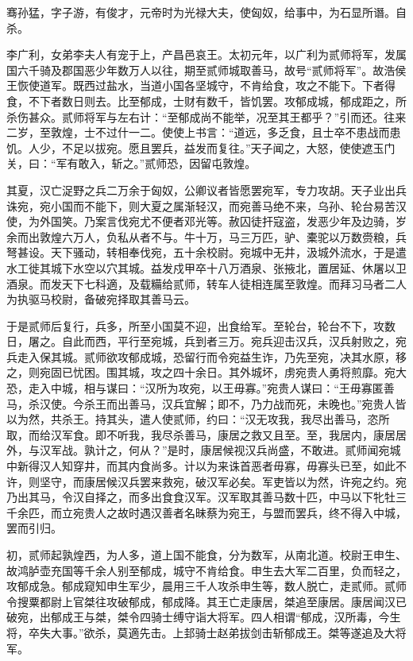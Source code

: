 \documentclass[]{article}
\begin{document}
骞孙猛，字子游，有俊才，元帝时为光禄大夫，使匈奴，给事中，为石显所谮。自杀。

李广利，女弟李夫人有宠于上，产昌邑哀王。太初元年，以广利为贰师将军，发属国六千骑及郡国恶少年数万人以往，期至贰师城取善马，故号``贰师将军''。故浩侯王恢使道军。既西过盐水，当道小国各坚城守，不肯给食，攻之不能下。下者得食，不下者数日则去。比至郁成，士财有数千，皆饥罢。攻郁成城，郁成距之，所杀伤甚众。贰师将军与左右计：``至郁成尚不能举，况至其王都乎？''引而还。往来二岁，至敦煌，士不过什一二。使使上书言：``道远，多乏食，且士卒不患战而患饥。人少，不足以拔宛。愿且罢兵，益发而复往。''天子闻之，大怒，使使遮玉门关，曰：``军有敢入，斩之。''贰师恐，因留屯敦煌。

其夏，汉亡浞野之兵二万余于匈奴，公卿议者皆愿罢宛军，专力攻胡。天子业出兵诛宛，宛小国而不能下，则大夏之属渐轻汉，而宛善马绝不来，乌孙、轮台易苦汉使，为外国笑。乃案言伐宛尤不便者邓光等。赦囚徒扞寇盗，发恶少年及边骑，岁余而出敦煌六万人，负私从者不与。牛十万，马三万匹，驴、橐驼以万数赍粮，兵弩甚设。天下骚动，转相奉伐宛，五十余校尉。宛城中无井，汲城外流水，于是遣水工徙其城下水空以穴其城。益发戍甲卒十八万酒泉、张掖北，置居延、休屠以卫酒泉。而发天下七科適，及载糒给贰师，转车人徒相连属至敦煌。而拜习马者二人为执驱马校尉，备破宛择取其善马云。

于是贰师后复行，兵多，所至小国莫不迎，出食给军。至轮台，轮台不下，攻数日，屠之。自此而西，平行至宛城，兵到者三万。宛兵迎击汉兵，汉兵射败之，宛兵走入保其城。贰师欲攻郁成城，恐留行而令宛益生诈，乃先至宛，决其水原，移之，则宛固已忧困。围其城，攻之四十余日。其外城坏，虏宛贵人勇将煎靡。宛大恐，走入中城，相与谋曰：``汉所为攻宛，以王毋寡。''宛贵人谋曰：``王毋寡匿善马，杀汉使。今杀王而出善马，汉兵宜解；即不，乃力战而死，未晚也。''宛贵人皆以为然，共杀王。持其头，遣人使贰师，约曰：``汉无攻我，我尽出善马，恣所取，而给汉军食。即不听我，我尽杀善马，康居之救又且至。至，我居内，康居居外，与汉军战。孰计之，何从？''是时，康居候视汉兵尚盛，不敢进。贰师闻宛城中新得汉人知穿井，而其内食尚多。计以为来诛首恶者毋寡，毋寡头已至，如此不许，则坚守，而康居候汉兵罢来救宛，破汉军必矣。军吏皆以为然，许宛之约。宛乃出其马，令汉自择之，而多出食食汉军。汉军取其善马数十匹，中马以下牝牡三千余匹，而立宛贵人之故时遇汉善者名昧蔡为宛王，与盟而罢兵，终不得入中城，罢而引归。

初，贰师起孰煌西，为人多，道上国不能食，分为数军，从南北道。校尉王申生、故鸿胪壶充国等千余人别至郁成，城守不肯给食。申生去大军二百里，负而轻之，攻郁成急。郁成窥知申生军少，晨用三千人攻杀申生等，数人脱亡，走贰师。贰师令搜粟都尉上官桀往攻破郁成，郁成降。其王亡走康居，桀追至康居。康居闻汉已破宛，出郁成王与桀，桀令四骑士缚守诣大将军。四人相谓``郁成，汉所毒，今生将，卒失大事。''欲杀，莫適先击。上邽骑士赵弟拔剑击斩郁成王。桀等遂追及大将军。
\end{document}
